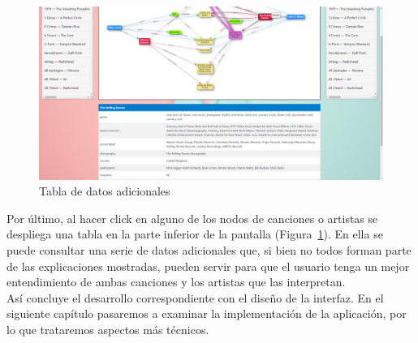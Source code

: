 \begin{figure}[h!]
	\centering
	\includegraphics[width = 1\textwidth]{Imagenes/Bitmap/Pantalla tabla.png}
	\caption{Tabla de datos adicionales}
	\label{fig:tablaAdicional}
\end{figure}

Por último, al hacer click en alguno de los nodos de canciones o artistas se despliega una tabla en la parte inferior de la pantalla (Figura~\ref{fig:tablaAdicional}). En ella se puede consultar una serie de datos adicionales que, si bien no todos forman parte de las explicaciones mostradas, pueden servir para que el usuario tenga un mejor entendimiento de ambas canciones y los artistas que las interpretan.\\

Así concluye el desarrollo correspondiente con el diseño de la interfaz. En el siguiente capítulo pasaremos a examinar la implementación de la aplicación, por lo que trataremos aspectos más técnicos.\\